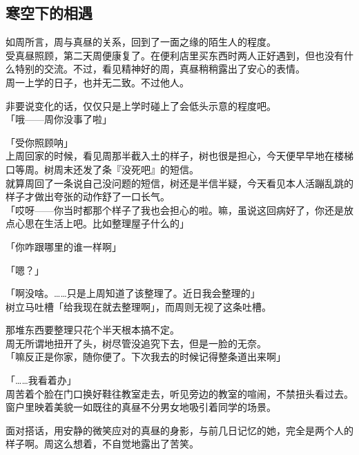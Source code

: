 \subsection{寒空下的相遇}

如周所言，周与真昼的关系，回到了一面之缘的陌生人的程度。\\

受真昼照顾，第二天周便康复了。在便利店里买东西时两人正好遇到，但也没有什么特别的交流。不过，看见精神好的周，真昼稍稍露出了安心的表情。\\

周一上学的日子，也并无二致。不过他人。

非要说变化的话，仅仅只是上学时碰上了会低头示意的程度吧。\\

「哦——周你没事了啦」

「受你照顾呐」\\

上周回家的时候，看见周那半截入土的样子，树也很是担心，今天便早早地在楼梯口等周。树周末还发了条『没死吧』的短信。\\

就算周回了一条说自己没问题的短信，树还是半信半疑，今天看见本人活蹦乱跳的样子才做出夸张的动作舒了一口长气。\\

「哎呀——你当时都那个样子了我也会担心的啦。嘛，虽说这回病好了，你还是放点心思在生活上吧。比如整理屋子什么的」

「你咋跟哪里的谁一样啊」

「嗯？」

「啊没啥。……只是上周知道了该整理了。近日我会整理的」\\

树立马吐槽「给我现在就去整理啊」，而周则无视了这条吐槽。

那堆东西要整理只花个半天根本搞不定。\\

周无所谓地扭开了头，树尽管没追究下去，但是一脸的无奈。\\

「嘛反正是你家，随你便了。下次我去的时候记得整条道出来啊」

「……我看着办」\\

周苦着个脸在门口换好鞋往教室走去，听见旁边的教室的喧闹，不禁扭头看过去。\\

窗户里映着美貌一如既往的真昼不分男女地吸引着同学的场景。

面对搭话，用安静的微笑应对的真昼的身影，与前几日记忆的她，完全是两个人的样子啊。周这么想着，不自觉地露出了苦笑。\\

